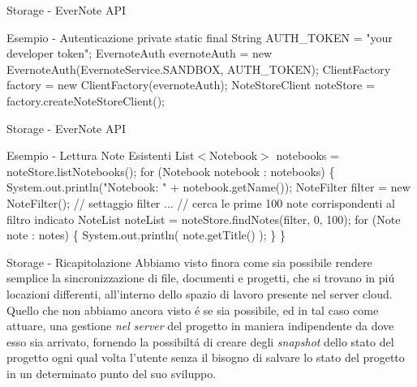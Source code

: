 \documentclass{beamer}
\begin{document}
\begin{frame}{Storage - EverNote API}
\begin{exampleblock}{Esempio - Autenticazione}
{\small
private static final String AUTH\_TOKEN = "your developer token";
\newline
EvernoteAuth evernoteAuth = new EvernoteAuth(EvernoteService.SANDBOX,  AUTH\_TOKEN);
\newline
ClientFactory factory = new ClientFactory(evernoteAuth);
\newline
NoteStoreClient noteStore = factory.createNoteStoreClient();
}
\end{exampleblock}
\end{frame}

\begin{frame}{Storage - EverNote API}
\begin{exampleblock}{Esempio - Lettura Note Esistenti}
{\small
List$<$Notebook$>$ notebooks = noteStore.listNotebooks();
\newline
for (Notebook notebook : notebooks) \{
\newline
\hspace*{5 mm}System.out.println("Notebook: " + notebook.getName());
\newline
\hspace*{5 mm}NoteFilter filter = new NoteFilter();
\newline
\hspace*{5 mm}// settaggio filter
\newline
\hspace*{5 mm}...
\newline
\hspace*{5 mm}// cerca le prime 100 note corrispondenti al filtro indicato
\newline
\hspace*{5 mm}NoteList noteList = noteStore.findNotes(filter, 0, 100);
\newline
\hspace*{5 mm}for (Note note : notes) \{
\newline
\hspace*{10 mm} System.out.println( note.getTitle() );
\newline
\hspace*{5 mm} \}
\newline
\}
}
\end{exampleblock}
\end{frame}

\begin{frame}{Storage - Ricapitolazione}
Abbiamo visto finora come sia possibile rendere semplice la sincronizzazione di file, documenti e progetti, che si trovano in pi\'u
locazioni differenti, all'interno dello spazio di lavoro presente nel server cloud. Quello che non abbiamo ancora visto \'e
se sia possibile, ed in tal caso come attuare, una gestione \emph{nel server} del progetto in maniera indipendente da dove esso
sia arrivato, fornendo la possibilt\'a di creare degli \emph{snapshot} dello stato del progetto ogni qual volta l'utente senza
il bisogno di salvare lo stato del progetto in un determinato punto del suo sviluppo.
\end{frame}
\end{document}
